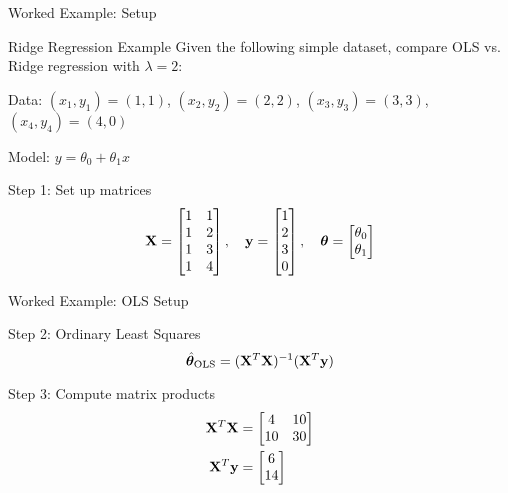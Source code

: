 \documentclass{beamer}
\begin{document}
\begin{frame}{Worked Example: Setup}
\begin{examplebox}{Ridge Regression Example}
Given the following simple dataset, compare OLS vs. Ridge regression with $\lambda = 2$:

\vspace{0.3cm}
Data: $(x_1, y_1) = (1, 1)$, $(x_2, y_2) = (2, 2)$, $(x_3, y_3) = (3, 3)$, $(x_4, y_4) = (4, 0)$

Model: $y = \theta_0 + \theta_1 x$
\end{examplebox}
\pause

\begin{codebox}{Step 1: Set up matrices}
$$\mathbf{X} = \begin{bmatrix} 1 & 1 \\ 1 & 2 \\ 1 & 3 \\ 1 & 4 \end{bmatrix}, \quad \mathbf{y} = \begin{bmatrix} 1 \\ 2 \\ 3 \\ 0 \end{bmatrix}, \quad \boldsymbol{\theta} = \begin{bmatrix} \theta_0 \\ \theta_1 \end{bmatrix}$$
\end{codebox}
\end{frame}

\begin{frame}{Worked Example: OLS Setup}
\begin{codebox}{Step 2: Ordinary Least Squares}
$$\hat{\boldsymbol{\theta}}_{\text{OLS}} = (\mathbf{X}^{T}\mathbf{X})^{-1}(\mathbf{X}^{T}\mathbf{y})$$
\end{codebox}
\pause

\begin{codebox}{Step 3: Compute matrix products}
\begin{align*}
\mathbf{X}^{T}\mathbf{X} &= \begin{bmatrix} 4 & 10 \\ 10 & 30 \end{bmatrix} \\
\mathbf{X}^{T}\mathbf{y} &= \begin{bmatrix} 6 \\ 14 \end{bmatrix}
\end{align*}
\end{codebox}
\end{frame}
\end{document}
